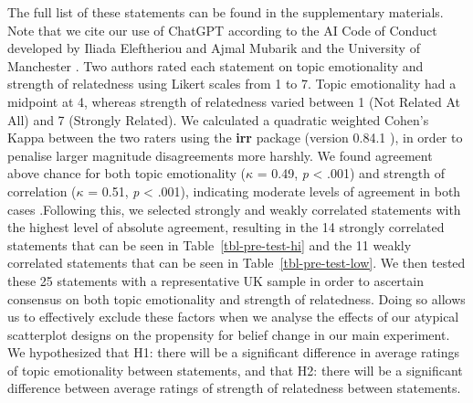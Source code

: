 \documentclass[manuscript,screen,review]{acmart}
\begin{document}
The full list of these statements can be found in the supplementary
materials. Note that we cite our use of ChatGPT according to the AI Code
of Conduct developed by Iliada Eleftheriou and Ajmal Mubarik and the
University of Manchester \citep{iliada_2023}. Two authors rated each
statement on topic emotionality and strength of relatedness using Likert
scales from 1 to 7. Topic emotionality had a midpoint at 4, whereas
strength of relatedness varied between 1 (Not Related At All) and 7
(Strongly Related). We calculated a quadratic weighted Cohen's Kappa
between the two raters using the \textbf{irr} package (version 0.84.1
\citep{irr}), in order to penalise larger magnitude disagreements more
harshly. We found agreement above chance for both topic emotionality
(\(\kappa\) = 0.49, \emph{p} \textless{} .001) and strength of
correlation (\(\kappa\) = 0.51, \emph{p} \textless{} .001), indicating
moderate levels of agreement in both cases
\citep{cohen_1968, fleiss_1969}.Following this, we selected strongly and
weakly correlated statements with the highest level of absolute
agreement, resulting in the 14 strongly correlated statements that can
be seen in Table~\ref{tbl-pre-test-hi} and the 11 weakly correlated
statements that can be seen in Table~\ref{tbl-pre-test-low}. We then
tested these 25 statements with a representative UK sample in order to
ascertain consensus on both topic emotionality and strength of
relatedness. Doing so allows us to effectively exclude these factors
when we analyse the effects of our atypical scatterplot designs on the
propensity for belief change in our main experiment. We hypothesized
that H1: there will be a significant difference in average ratings of
topic emotionality between statements, and that H2: there will be a
significant difference between average ratings of strength of
relatedness between statements.
\end{document}
